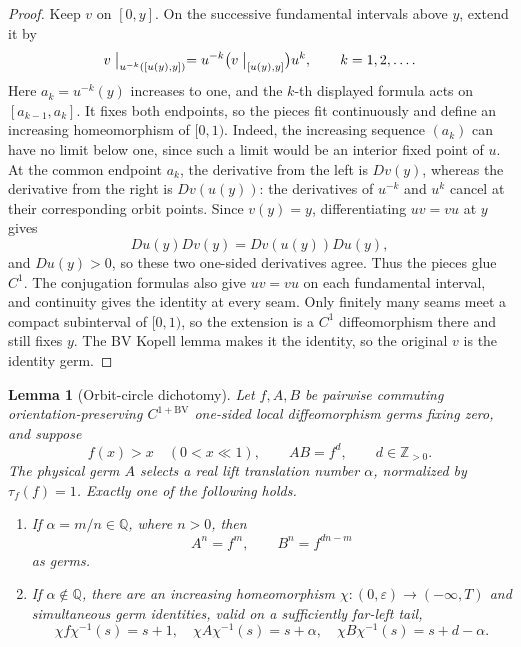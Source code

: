 \documentclass[11pt]{article}
\newtheorem{lemma}[theorem]{Lemma}
\theoremstyle{definition}
\theoremstyle{remark}
\begin{document}
\begin{proof}
Keep \(v\) on \([0,y]\).  On the successive fundamental intervals above
\(y\), extend it by
\[
 v\bigm|_{u^{-k}([u(y),y])}
   =u^{-k}\bigl(v\bigm|_{[u(y),y]}\bigr)u^k,
 \qquad k=1,2,\ldots .
\]
Here \(a_k=u^{-k}(y)\) increases to one, and the \(k\)-th displayed formula
acts on \([a_{k-1},a_k]\).  It fixes both endpoints, so the pieces fit
continuously and define an increasing homeomorphism of \([0,1)\).  Indeed,
the increasing sequence \((a_k)\) can have no limit below one, since such a
limit would be an interior fixed point of \(u\).
At the common endpoint \(a_k\), the derivative from the left is \(Dv(y)\),
whereas the derivative from the right is \(Dv(u(y))\): the derivatives of
\(u^{-k}\) and \(u^k\) cancel at their corresponding orbit points.  Since
\(v(y)=y\), differentiating \(uv=vu\) at \(y\) gives
\[
 Du(y)Dv(y)=Dv(u(y))Du(y),
\]
and \(Du(y)>0\), so these two one-sided derivatives agree.  Thus the pieces
glue \(C^1\).  The conjugation formulas also give \(uv=vu\) on each
fundamental interval, and continuity gives the identity at every seam.
Only finitely many seams meet a compact subinterval of \([0,1)\), so the
extension is a \(C^1\) diffeomorphism there and still fixes \(y\).
The BV Kopell lemma makes it the identity, so the original \(v\) is the
identity germ.
\end{proof}

\begin{lemma}[Orbit-circle dichotomy]\label{lem:orbit-circle}
Let \(f,A,B\) be pairwise commuting orientation-preserving
\(C^{1+\mathrm{BV}}\) one-sided local diffeomorphism germs fixing zero, and
suppose
\[
 f(x)>x\quad(0<x\ll1),\qquad AB=f^d,\qquad d\in\mathbb Z_{>0}.
\]
The physical germ \(A\) selects a real lift translation number \(\alpha\),
normalized by \(\tau_f(f)=1\).  Exactly one of the following holds.
\begin{enumerate}
\item If \(\alpha=m/n\in\mathbb Q\), where \(n>0\), then
\begin{equation}\label{eq:rational-germ-powers}
 A^n=f^m,\qquad B^n=f^{dn-m}
\end{equation}
as germs.
\item If \(\alpha\notin\mathbb Q\), there are an increasing homeomorphism
\(\chi:(0,\varepsilon)\to(-\infty,T)\) and simultaneous germ identities,
valid on a sufficiently far-left tail,
\begin{equation}\label{eq:irrational-germ-translations}
 \chi f\chi^{-1}(s)=s+1,\quad
 \chi A\chi^{-1}(s)=s+\alpha,\quad
 \chi B\chi^{-1}(s)=s+d-\alpha.
\end{equation}
\end{enumerate}
\end{lemma}
\end{document}
